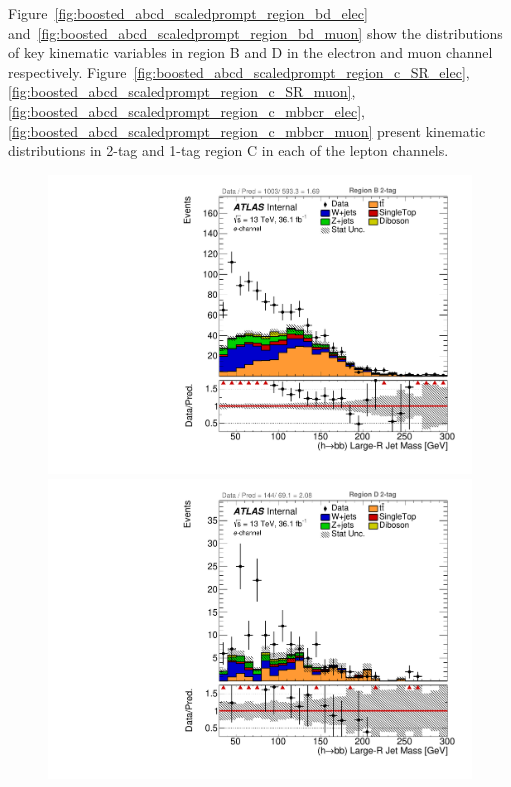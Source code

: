 Figure~\ref{fig:boosted_abcd_scaledprompt_region_bd_elec} and~\ref{fig:boosted_abcd_scaledprompt_region_bd_muon} show
the distributions of key kinematic variables in region B and D in the electron and muon channel respectively.
Figure~\ref{fig:boosted_abcd_scaledprompt_region_c_SR_elec},\ref{fig:boosted_abcd_scaledprompt_region_c_SR_muon},
\ref{fig:boosted_abcd_scaledprompt_region_c_mbbcr_elec},\ref{fig:boosted_abcd_scaledprompt_region_c_mbbcr_muon} present
kinematic distributions in 2-tag and 1-tag region C in each of the lepton channels.


\begin{figure}[!htbp]
\begin{center}
\includegraphics[scale=0.33]{./figures/boosted/ABCD_ScaledPrompt/elec_Inc_RegionB_HbbMass}
\includegraphics[scale=0.33]{./figures/boosted/ABCD_ScaledPrompt/elec_Inc_RegionD_HbbMass}\\

\end{center}
\end{figure}
